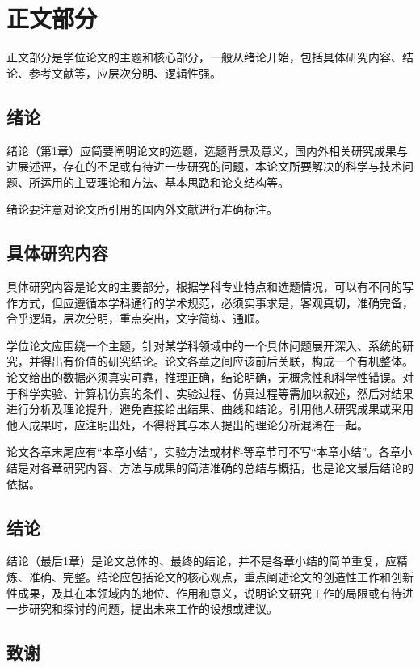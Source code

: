 \section{正文部分}

正文部分是学位论文的主题和核心部分，一般从绪论开始，包括具体研究内容、结论、参考文献等，应层次分明、逻辑性强。

\subsection{绪论}

绪论（第1章）应简要阐明论文的选题，选题背景及意义，国内外相关研究成果与进展述评，存在的不足或有待进一步研究的问题，本论文所要解决的科学与技术问题、所运用的主要理论和方法、基本思路和论文结构等。

绪论要注意对论文所引用的国内外文献进行准确标注。

\subsection{具体研究内容}

具体研究内容是论文的主要部分，根据学科专业特点和选题情况，可以有不同的写作方式，但应遵循本学科通行的学术规范，必须实事求是，客观真切，准确完备，合乎逻辑，层次分明，重点突出，文字简练、通顺。

学位论文应围绕一个主题，针对某学科领域中的一个具体问题展开深入、系统的研究，并得出有价值的研究结论。论文各章之间应该前后关联，构成一个有机整体。论文给出的数据必须真实可靠，推理正确，结论明确，无概念性和科学性错误。对于科学实验、计算机仿真的条件、实验过程、仿真过程等需加以叙述，然后对结果进行分析及理论提升，避免直接给出结果、曲线和结论。引用他人研究成果或采用他人成果时，应注明出处，不得将其与本人提出的理论分析混淆在一起。

论文各章末尾应有“本章小结”，实验方法或材料等章节可不写“本章小结”。各章小结是对各章研究内容、方法与成果的简洁准确的总结与概括，也是论文最后结论的依据。

\subsection{结论}

结论（最后1章）是论文总体的、最终的结论，并不是各章小结的简单重复，应精炼、准确、完整。结论应包括论文的核心观点，重点阐述论文的创造性工作和创新性成果，及其在本领域内的地位、作用和意义，说明论文研究工作的局限或有待进一步研究和探讨的问题，提出未来工作的设想或建议。

\subsection{致谢}

